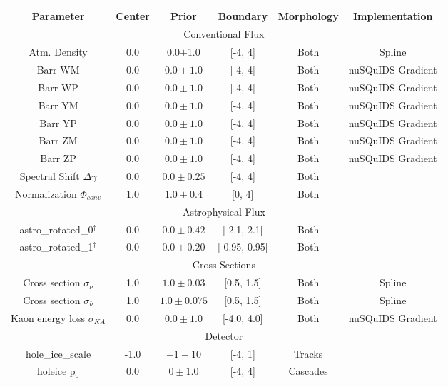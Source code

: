 \documentclass[main.tex]{subfiles}
\begin{document}
\begin{table}
    \centering
    \begin{tabular}{c | ccccc}\rowcolor{blue!25}
        {\large \textbf{Parameter}} & {\large \textbf{Center}} & {\large \textbf{Prior}} & {\large \textbf{Boundary}}& {\large \textbf{Morphology}} & {\large \textbf{Implementation}}\\ \hline
        \multicolumn{6}{c}{Conventional Flux} \\\hline
        Atm. Density & 0.0 & 0.0$\pm$1.0 & [-4, 4] & Both &  Spline\\
        Barr WM  & 0.0 & $0.0\pm1.0$ & [-4, 4]& Both & nuSQuIDS Gradient \\
        Barr WP  & 0.0 & $0.0\pm1.0$ & [-4, 4]& Both & nuSQuIDS Gradient \\
        Barr YM  & 0.0 & $0.0\pm1.0$ & [-4, 4]& Both & nuSQuIDS Gradient \\
        Barr YP  & 0.0 & $0.0\pm1.0$ & [-4, 4]& Both & nuSQuIDS Gradient \\
        Barr ZM  & 0.0 & $0.0\pm1.0$ & [-4, 4]& Both & nuSQuIDS Gradient \\
        Barr ZP  & 0.0 & $0.0\pm1.0$ & [-4, 4]& Both & nuSQuIDS Gradient \\
        Spectral Shift $\Delta \gamma$ & 0.0 & $0.0\pm0.25$ & [-4, 4]& Both &  \\
        Normalization $\Phi_{conv}$ & 1.0 & $1.0\pm0.4$ & [0, 4] & Both & \\
        \multicolumn{6}{c}{Astrophysical Flux} \\\hline
        astro\_rotated\_0$^{\dag}$ & 0.0 & $0.0\pm 0.42 $ & [-2.1, 2.1]&Both & \\
        astro\_rotated\_1$^{\dag}$ & 0.0 & $0.0\pm0.20$ & [-0.95, 0.95]&Both & \\
        \multicolumn{6}{c}{Cross Sections} \\\hline
        Cross section $\sigma_{\nu}$ & 1.0 & $1.0\pm0.03$ & [0.5, 1.5]& Both & Spline \\
        Cross section $\sigma_{\bar{\nu}}$ & 1.0 & $1.0\pm0.075$ & [0.5, 1.5]& Both & Spline \\
        Kaon energy loss $\sigma_{KA}$ & 0.0 & $0.0\pm1.0$ & [-4.0, 4.0]& Both &  nuSQuIDS Gradient\\
        \multicolumn{6}{c}{Detector} \\\hline 
        hole\_ice\_scale & -1.0 & $-1\pm10$ & [-4, 1]&Tracks & \\
        holeice p$_{0}$ & 0.0 & $0\pm 1.0$ & [-4, 4]&Cascades & \\

\end{tabular}
\end{table}
\end{document}
